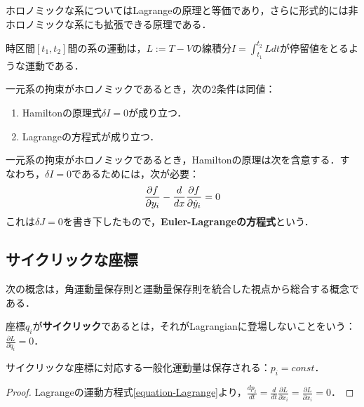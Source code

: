 \documentclass[uplatex, dvipdfmx]{jsreport}
\begin{document}
\begin{tcolorbox}[colframe=ForestGreen, colback=ForestGreen!10!white,breakable,colbacktitle=ForestGreen!40!white,coltitle=black,fonttitle=\bfseries\sffamily,
title=]
    ホロノミックな系についてはLagrangeの原理と等価であり，さらに形式的には非ホロノミックな系にも拡張できる原理である．
\end{tcolorbox}

\begin{axiom}[Hamiltonの原理]
    時区間$[t_1,t_2]$間の系の運動は，$L:=T-V$の線積分$I=\int^{t_2}_{t_1}Ldt$が停留値をとるような運動である．
\end{axiom}

\begin{theorem}[２つの原理の等価性]
    一元系の拘束がホロノミックであるとき，次の2条件は同値：
    \begin{enumerate}
        \item Hamiltonの原理式$\delta I=0$が成り立つ．
        \item Lagrangeの方程式が成り立つ．
    \end{enumerate}
\end{theorem}

\begin{proposition}[Hamiltonの原理の必要条件]
    一元系の拘束がホロノミックであるとき，Hamiltonの原理は次を含意する．すなわち，$\delta I=0$であるためには，次が必要：
    \[\frac{\partial f}{\partial y_i}-\frac{d }{d x}\frac{\partial f}{\partial \dot{y}_i}=0\]
    これは$\delta J=0$を書き下したもので，\textbf{Euler-Lagrangeの方程式}という．
\end{proposition}


\subsection{サイクリックな座標}


次の概念は，角運動量保存則と運動量保存則を統合した視点から総合する概念である．

\begin{definition}
    座標$q_i$が\textbf{サイクリック}であるとは，それがLagrangianに登場しないことをいう：$\frac{\partial L}{\partial\dot{q}_i}=0$．
\end{definition}
\begin{theorem}
    サイクリックな座標に対応する一般化運動量は保存される：$p_i=const$．
\end{theorem}
\begin{proof}
    Lagrangeの運動方程式\ref{equation-Lagrange}より，$\frac{dp_i}{dt}=\frac{d}{dt}\frac{\partial L}{\partial \dot{x}_i}=\frac{\partial L}{\partial x_i}=0$．
\end{proof}
\end{document}
